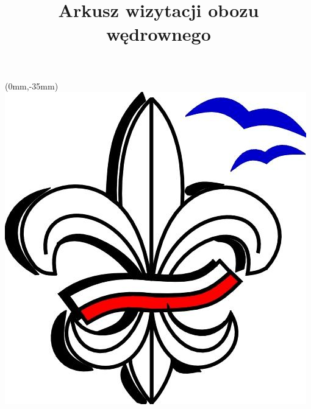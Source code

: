 \documentclass[a4paper,10pt,notitlepage,twoside]{article}
\title{Arkusz wizytacji obozu wędrownego}
\date{} %
\begin{document}
\renewcommand{\headwidth}{18cm} %


\maketitle
\thispagestyle{fancy} %

\begin{textblock*}{20mm}(0mm,-35mm)
\includegraphics[scale=0.15]{lilijka_opom.jpg}
\end{textblock*}
\end{document}

